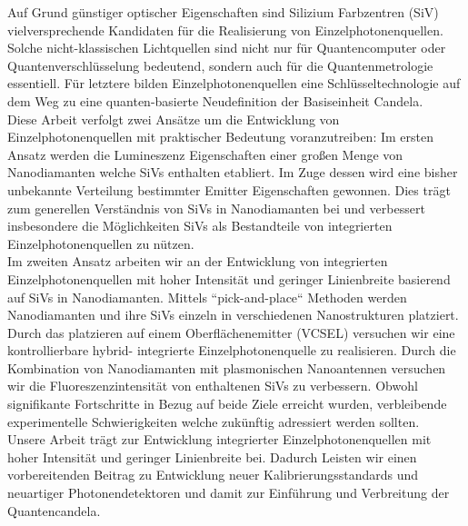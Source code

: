 	Auf Grund günstiger optischer Eigenschaften sind Silizium Farbzentren (SiV) vielversprechende Kandidaten für die Realisierung von Einzelphotonenquellen. Solche nicht-klassischen Lichtquellen sind nicht nur für Quantencomputer oder Quantenverschlüsselung bedeutend, sondern auch für die Quantenmetrologie essentiell. Für letztere bilden Einzelphotonenquellen eine Schlüsseltechnologie auf dem Weg zu eine quanten-basierte Neudefinition der Basiseinheit Candela.
	\\
	Diese Arbeit verfolgt zwei Ansätze um die Entwicklung von Einzelphotonenquellen mit praktischer Bedeutung voranzutreiben: Im ersten Ansatz werden die Lumineszenz Eigenschaften einer großen Menge von Nanodiamanten welche SiVs enthalten etabliert. Im Zuge dessen wird eine bisher unbekannte Verteilung bestimmter Emitter Eigenschaften gewonnen. Dies trägt zum generellen Verständnis von SiVs in Nanodiamanten bei und verbessert insbesondere die Möglichkeiten SiVs als Bestandteile von integrierten Einzelphotonenquellen zu nützen.
	\\
	Im zweiten Ansatz arbeiten wir an der Entwicklung von integrierten Einzelphotonenquellen mit hoher Intensität und geringer Linienbreite basierend auf SiVs in Nanodiamanten. Mittels “pick-and-place“ Methoden werden Nanodiamanten und ihre SiVs einzeln in verschiedenen Nanostrukturen platziert. Durch das platzieren auf einem Oberflächenemitter (VCSEL) versuchen wir eine kontrollierbare hybrid- integrierte Einzelphotonenquelle zu realisieren. Durch die Kombination von Nanodiamanten mit plasmonischen Nanoantennen versuchen wir die Fluoreszenzintensität von enthaltenen SiVs zu verbessern. Obwohl signifikante Fortschritte in Bezug auf beide Ziele erreicht wurden, verbleibende experimentelle Schwierigkeiten welche zukünftig adressiert werden sollten. 
	\\
	Unsere Arbeit trägt zur Entwicklung integrierter Einzelphotonenquellen mit hoher Intensität und geringer Linienbreite bei. Dadurch Leisten wir einen vorbereitenden Beitrag zu Entwicklung neuer Kalibrierungsstandards und neuartiger Photonendetektoren und damit zur Einführung und Verbreitung der Quantencandela. 

\vfill
